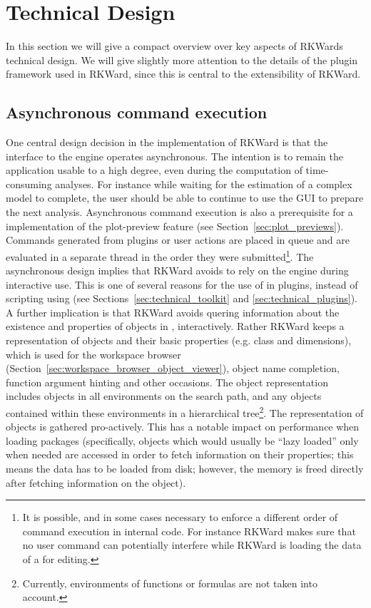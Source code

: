 \section{Technical Design}
\label{sec:technical}
In this section we will give a compact overview over key aspects of RKWards
technical design. We will give slightly more attention to the details of the
plugin framework used in RKWard, since this is central to the extensibility of
RKWard.

\subsection{Asynchronous command execution}
\label{sec:technical_asynchronous}
One central design decision in the implementation of RKWard is that the
interface to the  engine operates asynchronous. The intention is to
remain the application usable to a high degree, even during the computation of
time-consuming analyses. For instance while waiting for the estimation of a
complex model to complete, the user should be able to continue to use the GUI to
prepare the next analysis. Asynchronous command execution is also a prerequisite
for a implementation of the plot-preview feature (see Section~\ref{sec:plot_previews}). Commands
generated from plugins or user actions are placed in queue and are evaluated in
a separate thread in the order they were submitted\footnote{
    It is possible, and in some cases necessary to enforce a different order of command execution in
    internal code. For instance RKWard makes sure that no user command can
    potentially interfere while RKWard is loading the data of a  for
    editing.
}. The asynchronous design implies that RKWard avoids to rely on the
 engine during interactive use. This is one of several reasons for
the use of  in plugins, instead of scripting using
 (see Sections~\ref{sec:technical_toolkit} and \ref{sec:technical_plugins}).
A further implication is that RKWard avoids quering information about the
existence and properties of objects in , interactively. Rather
RKWard keeps a representation of  objects and their basic properties
(e.g. class and dimensions), which is used for the workspace browser (Section~\ref{sec:workspace_browser_object_viewer}),
object name completion, function argument hinting and
other occasions. The object representation includes objects in all environments
on the search path, and any objects contained within these environments in a
hierarchical tree\footnote{
    Currently, environments of functions or formulas are not taken into account.
}. The representation of  objects is gathered
pro-actively. This has a notable impact on performance when loading packages
(specifically, objects which would usually be ``lazy loaded'' only when needed \citep[see][]{Ripley2004} are
accessed in order to fetch information on their properties; this means the data
has to be loaded from disk; however, the memory is freed directly after fetching
information on the object).

